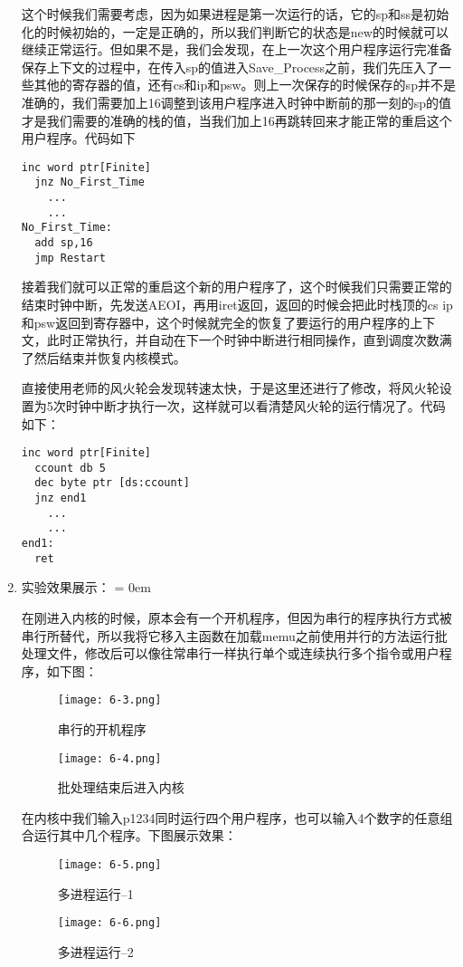 \documentclass[UTF8]{article}
\newcommand{\bg}{\colorbox{gray!13}}%
\begin{document}
\begin{enumerate}[1)]
\par 这个时候我们需要考虑，因为如果进程是第一次运行的话，它的sp和ss是初始化的时候初始的，一定是正确的，所以我们判断它的状态是new的时候就可以继续正常运行。但如果不是，我们会发现，在上一次这个用户程序运行完准备保存上下文的过程中，在传入sp的值进入\bg{Save\_Process}之前，我们先压入了一些其他的寄存器的值，还有cs和ip和psw。则上一次保存的时候保存的sp并不是准确的，我们需要加上16调整到该用户程序进入时钟中断前的那一刻的sp的值才是我们需要的准确的栈的值，当我们加上16再跳转回来才能正常的重启这个用户程序。代码如下
\begin{lstlisting}[language={[x86masm]Assembler}]inc word ptr[Finite]
  jnz No_First_Time
	...
	...
No_First_Time:	
  add sp,16 
  jmp Restart
\end{lstlisting}
\par 接着我们就可以正常的重启这个新的用户程序了，这个时候我们只需要正常的结束时钟中断，先发送AEOI，再用iret返回，返回的时候会把此时栈顶的cs ip和psw返回到寄存器中，这个时候就完全的恢复了要运行的用户程序的上下文，此时正常执行，并自动在下一个时钟中断进行相同操作，直到调度次数满了然后结束并恢复内核模式。
\par 直接使用老师的风火轮会发现转速太快，于是这里还进行了修改，将风火轮设置为5次时钟中断才执行一次，这样就可以看清楚风火轮的运行情况了。代码如下：
\begin{lstlisting}[language={[x86masm]Assembler}]inc word ptr[Finite]
  ccount db 5
  dec byte ptr [ds:ccount]
  jnz end1
	...
	...
end1:
  ret
\end{lstlisting}

\item 实验效果展示：
\parindent = 0em
\par
 在刚进入内核的时候，原本会有一个开机程序，但因为串行的程序执行方式被串行所替代，所以我将它移入主函数在加载memu之前使用并行的方法运行批处理文件，修改后可以像往常串行一样执行单个或连续执行多个指令或用户程序，如下图：
\begin{figure}[htbp]
			\begin{minipage}[t]{0.5\linewidth}
			\centering
			\texttt{[image: 6-3.png]}
			\caption{串行的开机程序}
			\end{minipage}
			\begin{minipage}[t]{0.5\linewidth}
				\centering
			\texttt{[image: 6-4.png]}
			\caption{批处理结束后进入内核}
			\end{minipage}
		\end{figure}
\par 在内核中我们输入\-p1234同时运行四个用户程序，也可以输入4个数字的任意组合运行其中几个程序。下图展示效果：
		\begin{figure}[htbp]
			\begin{minipage}[t]{0.5\linewidth}
			\centering
			\texttt{[image: 6-5.png]}
			\caption{多进程运行--1}
			\end{minipage}
			\begin{minipage}[t]{0.5\linewidth}
				\centering
			\texttt{[image: 6-6.png]}
			\caption{多进程运行--2}
			\end{minipage}
		\end{figure}
		

\end{enumerate}
\end{document}
